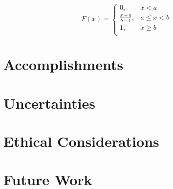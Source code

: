 \documentclass{senior-design}
\begin{document}
\begin{equation}
    F\left( x \right) =\begin{cases}
        0,&		x<a\\
        \frac{x-a}{b-1},&		a\leqslant x<b\\
        1,&		x\geqslant b\\
    \end{cases}
\end{equation}

\section{Accomplishments}
\section{Uncertainties}
\section{Ethical Considerations}
\section{Future Work}

\clearpage
\renewcommand*{\UrlFont}{\rmfamily}
\printbibliography[title={References},heading=bibintoc]
\thispagestyle{references}
\clearpage
\end{document}
